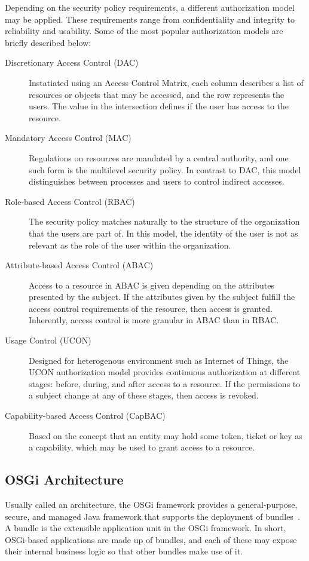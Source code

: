 \documentclass[12pt]{article}
\begin{document}
Depending on the security policy requirements, a different authorization model may be applied. These requirements range from confidentiality and integrity to reliability and usability. Some of the most popular authorization models are briefly described below:

\begin{description}
\item[Discretionary Access Control (DAC)] Instatiated using an Access Control Matrix, each column describes a list of resources or objects that may be accessed, and the row represents the users. The value in the intersection defines if the user has access to the resource.
\item[Mandatory Access Control (MAC)] Regulations on resources are mandated by a central authority, and one such form is the multilevel security policy. In contrast to DAC, this model distinguishes between processes and users to control indirect accesses.
\item[Role-based Access Control (RBAC)] The security policy matches naturally to the structure of the organization that the users are part of. In this model, the identity of the user is not as relevant as the role of the user within the organization.
\item[Attribute-based Access Control (ABAC)] Access to a resource in ABAC is given depending on the attributes presented by the subject. If the attributes given by the subject fulfill the access control requirements of the resource, then access is granted. Inherently, access control is more granular in ABAC than in RBAC.
\item[Usage Control (UCON)] Designed for heterogenous environment such as Internet of Things, the UCON authorization model provides continuous authorization at different stages: before, during, and after access to a resource. If the permissions to a subject change at any of these stages, then access is revoked. 
\item[Capability-based Access Control (CapBAC)] Based on the concept that an entity may hold some token, ticket or key as a capability, which may be used to grant access to a resource. 
\end{description}

\subsection{OSGi Architecture}

Usually called an architecture, the OSGi framework provides a general-purpose, secure, and managed Java framework that supports the deployment of bundles~\cite{osgi_core}. A bundle is the extensible application unit in the OSGi framework. In short, OSGi-based applications are made up of bundles, and each of these may expose their internal business logic so that other bundles make use of it. 
\end{document}
